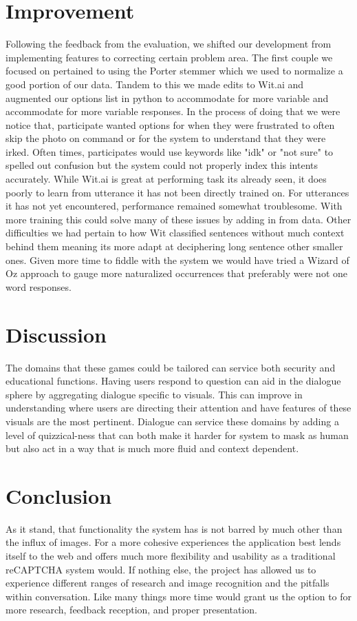 \documentclass[11pt,a4paper]{article}
\begin{document}
\section*{Improvement}

Following the feedback from the evaluation, we shifted our development from implementing features to correcting certain problem area. The first couple we focused on pertained to using the Porter stemmer which we used to normalize a good portion of our data. Tandem to this we made edits to Wit.ai and augmented our options list in python to accommodate  for more variable and accommodate for more variable responses. In the process of doing that we were notice that, participate wanted options for when they were frustrated to often skip the photo on command or for the system to understand that they were irked. Often times, participates would use keywords like "idk" or "not sure" to spelled out confusion but the system could not properly index this intents accurately. While Wit.ai is great at performing task its already seen, it does poorly to learn from utterance it has not been directly trained on. For utterances it has not yet encountered, performance remained somewhat troublesome. With more training this could solve many of these issues by adding in from data. Other difficulties we had pertain to how Wit classified sentences without much context behind them meaning its more adapt at deciphering long sentence other smaller ones. Given more time to fiddle with the system we would have tried a Wizard of Oz approach to gauge more naturalized occurrences that preferably were not one word responses. 

\section*{Discussion}
The domains that these games could be tailored can service both security and educational functions. Having users respond to question can aid in the dialogue sphere by aggregating dialogue specific to visuals. This can improve in understanding where users are directing their attention and have features of these visuals are the most pertinent. Dialogue can service these domains by adding a level of quizzical-ness that can both make it harder for system to mask as human but also act in a way that is much more fluid and context dependent. 

\section*{Conclusion}
As it stand, that functionality the system has is not barred by much other than the influx of images. For a more cohesive experiences the application best lends itself to the web and offers much more flexibility and usability as a traditional reCAPTCHA system would. If nothing else, the project has allowed us to experience different ranges of research and image recognition and the pitfalls within conversation. Like many things more time would grant us the option to for more research, feedback reception, and proper presentation. 
\end{document}
